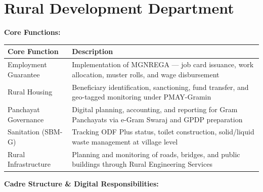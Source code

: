 \documentclass[11pt,a4paper]{article}
\begin{document}
\section{\textcolor{rdcol}{Rural Development Department}}

\textbf{Core Functions:}

\begin{table}[H]\centering\small
\begin{tabularx}{\textwidth}{L{3cm} X}
\toprule
\textbf{Core Function} & \textbf{Description} \\
\midrule
Employment Guarantee & Implementation of MGNREGA --- job card issuance, work allocation, muster rolls, and wage disbursement \\[3pt]
Rural Housing & Beneficiary identification, sanctioning, fund transfer, and geo-tagged monitoring under PMAY-Gramin \\[3pt]
Panchayat Governance & Digital planning, accounting, and reporting for Gram Panchayats via e-Gram Swaraj and GPDP preparation \\[3pt]
Sanitation (SBM-G) & Tracking ODF Plus status, toilet construction, solid/liquid waste management at village level \\[3pt]
Rural Infrastructure & Planning and monitoring of roads, bridges, and public buildings through Rural Engineering Services \\
\bottomrule
\end{tabularx}
\end{table}


\textbf{Cadre Structure \& Digital Responsibilities:}
\end{document}
